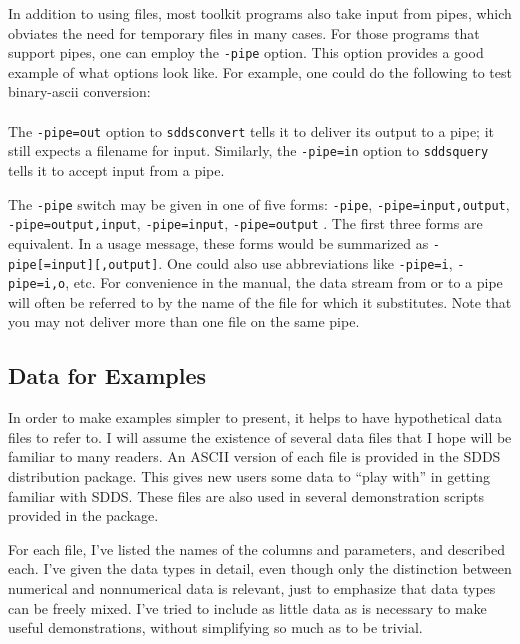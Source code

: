\documentclass[11pt]{article}
\begin{document}
In addition to using files, most toolkit programs also take input from pipes, which obviates the need for temporary
files in many cases.  For those programs that support pipes, one can employ the {\tt -pipe} option.  This option
provides a good example of what options look like.  For example, one could do the following to test binary-ascii
conversion:\\
\\
The {\tt -pipe=out} option to {\tt sddsconvert} tells it to deliver its output to a pipe; it still
expects a filename for input.  Similarly, the {\tt -pipe=in} option to {\tt sddsquery} tells it to
accept input from a pipe.  

The {\tt -pipe} switch may be given in one of five forms: {\tt -pipe}, {\tt -pipe=input,output}, {\tt
-pipe=output,input}, {\tt -pipe=input}, {\tt -pipe=output} .  The first three forms are equivalent.  In a usage
message, these forms would be summarized as {\tt -pipe[=input][,output]}.  One could also use abbreviations like
{\tt -pipe=i}, {\tt -pipe=i,o}, etc.  For convenience in the manual, the data stream from or to a pipe will 
often be referred to by the name of the file for which it substitutes.  Note that you may not deliver more
than one file on the same pipe.

\subsection{Data for Examples}
\label{exampleData}

In order to make examples simpler to present, it helps to have hypothetical data files to refer to.  I will assume the
existence of several data files that I hope will be familiar to many readers.  An ASCII version of each file is
provided in the SDDS distribution package.  This gives new users some data to ``play with'' in getting familiar with
SDDS.  These files are also used in several demonstration scripts provided in the package.  

For each file, I've listed the names of the columns and parameters, and described each.  I've given the data types in
detail, even though only the distinction between numerical and nonnumerical data is relevant, just to emphasize that
data types can be freely mixed.  I've tried to include as little data as is necessary to make useful demonstrations,
without simplifying so much as to be trivial.
\end{document}
